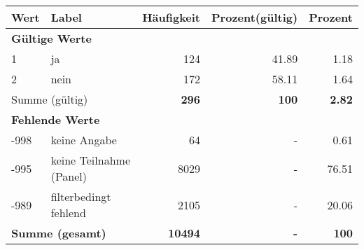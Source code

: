      \begin{longtable}{lXrrr}
     \toprule
     \textbf{Wert} & \textbf{Label} & \textbf{Häufigkeit} & \textbf{Prozent(gültig)} & \textbf{Prozent} \\
     \endhead
     \midrule
     \multicolumn{5}{l}{\textbf{Gültige Werte}}\\

     1 &
     \multicolumn{1}{X}{ ja   } &


       \num{124} &
       \num[round-mode=places,round-precision=2]{41,89} &
         \num[round-mode=places,round-precision=2]{1,18} \\

     2 &
     \multicolumn{1}{X}{ nein   } &


       \num{172} &
       \num[round-mode=places,round-precision=2]{58,11} &
         \num[round-mode=places,round-precision=2]{1,64} \\
     \midrule
     \multicolumn{2}{l}{Summe (gültig)} &
       \textbf{\num{296}} &
     \textbf{100} &
       \textbf{\num[round-mode=places,round-precision=2]{2,82}} \\
     \multicolumn{5}{l}{\textbf{Fehlende Werte}}\\
       -998 &
       keine Angabe &
         \num{64} &
        - &
         \num[round-mode=places,round-precision=2]{0,61} \\
       -995 &
       keine Teilnahme (Panel) &
         \num{8029} &
        - &
         \num[round-mode=places,round-precision=2]{76,51} \\
       -989 &
       filterbedingt fehlend &
         \num{2105} &
        - &
         \num[round-mode=places,round-precision=2]{20,06} \\
     \midrule
     \multicolumn{2}{l}{\textbf{Summe (gesamt)}} &
          \textbf{\num{10494}} &
        \textbf{-} &
        \textbf{100} \\
     \bottomrule
     \end{longtable}
     
